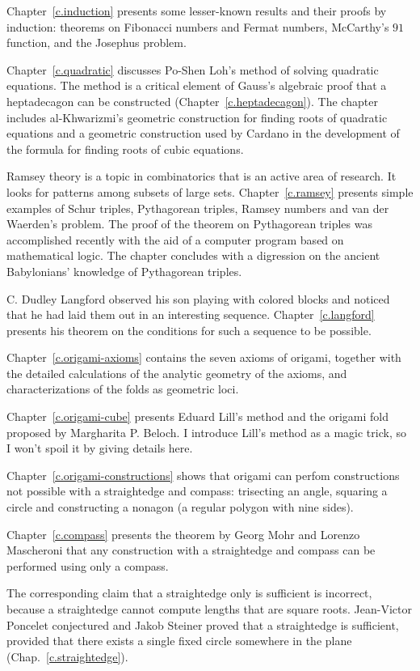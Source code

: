 Chapter~\ref{c.induction} presents some lesser-known results and their proofs by induction: theorems on Fibonacci numbers and Fermat numbers, McCarthy's $91$ function, and the Josephus problem.

Chapter~\ref{c.quadratic} discusses Po-Shen Loh's method of solving quadratic equations. The method is a critical element of Gauss's algebraic proof that a heptadecagon can be constructed (Chapter~\ref{c.heptadecagon}). The chapter includes al-Khwarizmi's geometric construction for finding roots of quadratic equations and a geometric construction used by Cardano in the development of the formula for finding roots of cubic equations.

Ramsey theory is a topic in combinatorics that is an active area of research. It looks for patterns among subsets of large sets. Chapter~\ref{c.ramsey} presents simple examples of Schur triples, Pythagorean triples, Ramsey numbers and van der Waerden's problem. The proof of the theorem on Pythagorean triples was accomplished recently with the aid of a computer program based on mathematical logic. The chapter concludes with a digression on the ancient Babylonians' knowledge of Pythagorean triples.

C. Dudley Langford observed his son playing with colored blocks and noticed that he had laid them out in an interesting sequence. Chapter~\ref{c.langford} presents his theorem on the conditions for such a sequence to be possible.

Chapter~\ref{c.origami-axioms} contains the seven axioms of origami, together with the detailed calculations of the analytic geometry of the axioms, and characterizations of the folds as geometric loci.

Chapter~\ref{c.origami-cube} presents Eduard Lill's method and the origami fold proposed by Margharita P. Beloch. I introduce Lill's method as a magic trick, so I won't spoil it by giving details here.

Chapter~\ref{c.origami-constructions} shows that origami can perfom constructions not possible with a straightedge and compass: trisecting an angle, squaring a circle and constructing a nonagon (a regular polygon with nine sides).

Chapter~\ref{c.compass} presents the theorem by Georg Mohr and Lorenzo Mascheroni that any construction with a straightedge and compass can be performed using only a compass.

The corresponding claim that a straightedge only is sufficient is  incorrect, because a straightedge cannot compute lengths that are square roots. Jean-Victor Poncelet conjectured and Jakob Steiner proved that a straightedge is sufficient, provided that there exists a single fixed circle somewhere in the plane (Chap.~\ref{c.straightedge}).


